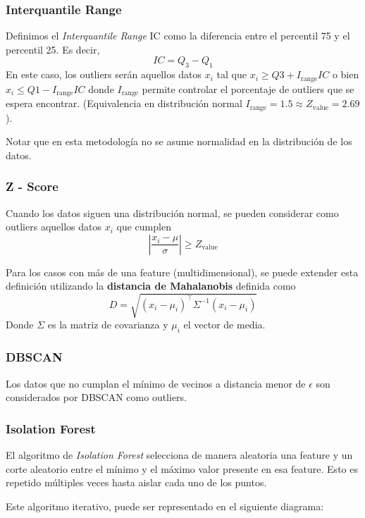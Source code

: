 \subsubsection{Interquantile Range}

Definimos el \textit{Interquantile Range} IC como la diferencia entre el percentil 75 y el percentil 25. Es decir, 
$$ 
IC = Q_3 - Q_1
$$
En este caso, los outliers serán aquellos datos $x_i$ tal que 
$x_i \geq Q3 + I_{\text{range}}IC$ o bien $x_i \leq Q1 - I_{\text{range}}IC$
donde $ I_{\text{range}}$ permite controlar el porcentaje de outliers que se espera encontrar. (Equivalencia en distribución normal $I_{\text{range}} = 1.5 \approx Z_{\text{value}} = 2.69$).

Notar que en esta metodología no se asume normalidad en la distribución de los datos. 

\subsubsection{Z - Score}

Cuando los datos siguen una distribución normal, se pueden considerar como outliers aquellos datos $x_i$ que cumplen 
$$\left | \frac{x_i - \mu}{\sigma}\right | \geq Z_{\text{value}}$$

Para los casos con más de una feature (multidimensional), se puede extender esta definición utilizando la \textbf{distancia de Mahalanobis} definida como 
$$
D = \sqrt{(x_i - \mu_i)^{\top}\Sigma^{-1}(x_i - \mu_i)}
$$
Donde $\Sigma$ es la matriz de covarianza y $\mu_i$ el vector de media. 

\subsubsection{DBSCAN}

Los datos que no cumplan el mínimo de vecinos a distancia menor de $\epsilon$ son considerados por DBSCAN como outliers.

\subsubsection{Isolation Forest}

El algoritmo de \textit{Isolation Forest} selecciona de manera aleatoria una feature y un corte aleatorio entre el mínimo y el máximo valor presente en esa feature. Esto es repetido múltiples veces hasta aislar cada uno de los puntos.

Este algoritmo iterativo, puede ser representado en el siguiente diagrama:

